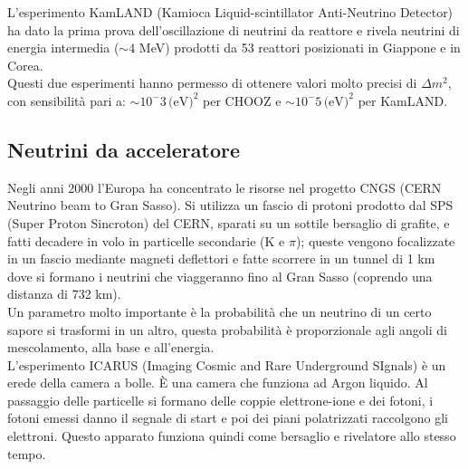 \documentclass[11pt, oneside]{article}   	%
\begin{document}

L'esperimento KamLAND (Kamioca Liquid-scintillator Anti-Neutrino Detector) ha dato la prima prova dell'oscillazione di neutrini da reattore e rivela neutrini di energia intermedia ($\sim 4$ MeV) prodotti da 53 reattori posizionati in Giappone e in Corea.\\
Questi due esperimenti hanno permesso di ottenere valori molto precisi di $\Delta m^2$, con sensibilità pari a: $\sim 10^-3 \,\text{(eV)}^2$ per CHOOZ e $\sim 10^-5 \,\text{(eV)}^2$ per KamLAND.


\subsection{Neutrini da acceleratore}
Negli anni 2000 l'Europa ha concentrato le risorse nel progetto CNGS (CERN Neutrino beam to Gran Sasso). Si utilizza un fascio di protoni prodotto dal SPS (Super Proton Sincroton) del CERN, sparati su un sottile bersaglio di grafite, e fatti decadere in volo in particelle secondarie (K e $\pi$); queste vengono focalizzate in un fascio mediante magneti deflettori e fatte scorrere in un tunnel di 1 km dove si formano i neutrini che viaggeranno fino al Gran Sasso (coprendo una distanza di 732 km). \\%
Un parametro molto importante è la probabilità che un neutrino di un certo sapore si trasformi in un altro, questa probabilità è proporzionale agli angoli di mescolamento, alla base e all'energia.\\
L'esperimento ICARUS (Imaging Cosmic and Rare Underground SIgnals) è un erede della camera a bolle. È una camera che funziona ad Argon liquido. Al passaggio delle particelle si formano delle coppie elettrone-ione e dei fotoni, i fotoni emessi danno il segnale di start e poi dei piani polatrizzati raccolgono gli elettroni. Questo apparato funziona quindi come bersaglio e rivelatore allo stesso tempo. %
\end{document}
